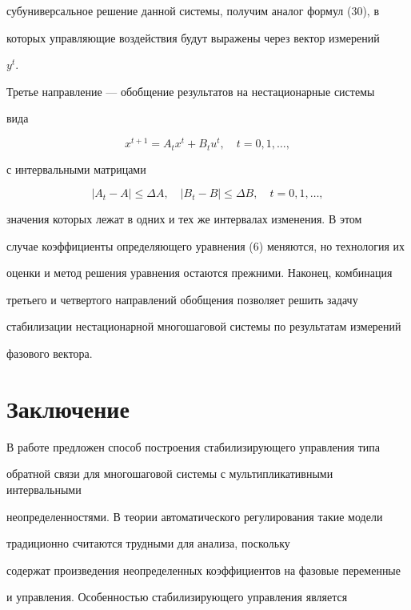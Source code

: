 субуниверсальное решение данной системы, получим аналог формул (30), в 


которых управляющие воздействия будут выражены через вектор измерений 


$y^t$.


 


Третье направление --- обобщение результатов на нестационарные системы 


вида 


$$ 


x^{t+1}=A_t x^t+B_t u^t,\quad t=0,1,\dotsc, 


$$ 


с интервальными матрицами 


$$ 


|A_t-A|\le\Delta A,\quad |B_t-B|\le\Delta B,\quad t=0,1,\dotsc, 


$$ 


значения которых лежат в одних и тех же интервалах изменения. В этом 


случае коэффициенты определяющего уравнения (6) меняются, но технология их 


оценки и метод решения уравнения остаются прежними. Наконец, комбинация 


третьего и четвертого направлений обобщения позволяет решить задачу 


стабилизации нестационарной многошаговой системы по результатам измерений 


фазового вектора. 


 


\section*{Заключение} 


 


В работе предложен способ построения стабилизирующего управления типа 


обратной связи для многошаговой системы с мультипликативными интервальными 


неопределенностями. В теории автоматического регулирования такие модели 


традиционно считаются трудными для анализа, поскольку 


содержат произведения неопределенных коэффициентов на фазовые переменные 


и управления. Особенностью стабилизирующего управления является 



